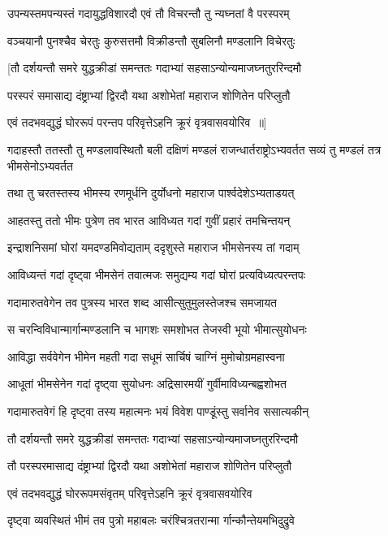 \twolineshloka
{उपन्यस्तमपन्यस्तं गदायुद्धविशारदौ}
{एवं तौ विचरन्तौ तु न्यघ्नतां वै परस्परम्}


\twolineshloka
{वञ्चयानौ पुनश्चैव चेरतुः कुरुसत्तमौ}
{विक्रीडन्तौ सुबलिनौ मण्डलानि विचेरतुः}


\twolineshloka
{[तौ दर्शयन्तौ समरे युद्धक्रीडां समन्ततः}
{गदाभ्यां सहसाऽन्योन्यमाजघ्नतुररिन्दमौ}


\twolineshloka
{परस्परं समासाद्य दंष्ट्राभ्यां द्विरदौ यथा}
{अशोभेतां महाराज शोणितेन परिप्लुतौ}


\twolineshloka
{एवं तदभवद्युद्धं घोररूपं परन्तप}
{परिवृत्तेऽहनि क्रूरं वृत्रवासवयोरिव ॥]}


\threelineshloka
{गदाहस्तौ ततस्तौ तु मण्डलावस्थितौ बली}
{दक्षिणं मण्डलं राजन्धार्तराष्ट्रोऽभ्यवर्तत}
{सव्यं तु मण्डलं तत्र भीमसेनोऽभ्यवर्तत}


\twolineshloka
{तथा तु चरतस्तस्य भीमस्य रणमूर्धनि}
{दुर्योधनो महाराज पार्श्वदेशेऽभ्यताडयत्}


\twolineshloka
{आहतस्तु ततो भीमः पुत्रेण तव भारत}
{आविध्यत गदां गुवीं प्रहारं तमचिन्तयन्}


\twolineshloka
{इन्द्राशनिसमां घोरां यमदण्डमिवोद्यताम्}
{ददृशुस्ते महाराज भीमसेनस्य तां गदाम्}


\twolineshloka
{आविध्यन्तं गदां दृष्ट्वा भीमसेनं तवात्मजः}
{समुद्यम्य गदां घोरां प्रत्यविध्यत्परन्तपः}


\twolineshloka
{गदामारुतवेगेन तव पुत्रस्य भारत}
{शब्द आसीत्सुतुमुलस्तेजश्च समजायत}


\twolineshloka
{स चरन्विविधान्मार्गान्मण्डलानि च भागशः}
{समशोभत तेजस्वी भूयो भीमात्सुयोधनः}


\twolineshloka
{आविद्धा सर्ववेगेन भीमेन महती गदा}
{सधूमं सार्चिषं चाग्निं मुमोचोग्रमहास्वना}


\twolineshloka
{आधूतां भीमसेनेन गदां दृष्ट्वा सुयोधनः}
{अद्रिसारमयीं गुर्वीमाविध्यन्बह्वशोभत}


\twolineshloka
{गदामारुतवेगं हि दृष्ट्वा तस्य महात्मनः}
{भयं विवेश पाण्डूंस्तु सर्वानेव ससात्यकीन्}


\twolineshloka
{तौ दर्शयन्तौ समरे युद्धक्रीडां समन्ततः}
{गदाभ्यां सहसाऽन्योन्यमाजघ्नतुररिन्दमौ}


\twolineshloka
{तौ परस्परमासाद्य दंष्ट्राभ्यां द्विरदौ यथा}
{अशोभेतां महाराज शोणितेन परिप्लुतौ}


\twolineshloka
{एवं तदभवद्युद्धं घोररूपमसंवृतम्}
{परिवृत्तेऽहनि क्रूरं वृत्रवासवयोरिव}


\twolineshloka
{दृष्ट्वा व्यवस्थितं भीमं तव पुत्रो महाबलः}
{चरंश्चित्रतरान्मा र्गान्कौन्तेयमभिदुद्रुवे}



